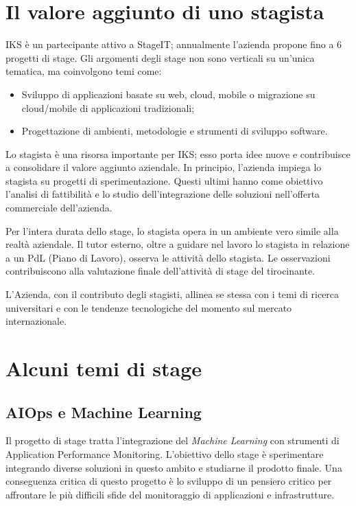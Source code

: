\section{Il valore aggiunto di uno stagista}

IKS è un partecipante attivo a StageIT; annualmente l'azienda propone fino a 6 progetti di stage. Gli argomenti degli stage non sono verticali su un'unica 
tematica, ma coinvolgono temi come: 

\begin{itemize}
	\item Sviluppo di applicazioni basate su web, \gls{cloud}, mobile 
	      o migrazione su \gls{cloud}/mobile di applicazioni tradizionali;
	\item Progettazione di ambienti, metodologie e strumenti di 
	      sviluppo software.
\end{itemize}

Lo stagista è una risorsa importante per IKS; esso porta idee nuove e contribuisce a consolidare il valore aggiunto aziendale.
In principio, l'azienda impiega lo stagista su progetti di sperimentazione. Questi ultimi hanno come obiettivo l'analisi di fattibilità e lo studio dell'integrazione delle soluzioni nell'offerta commerciale dell'azienda. 

Per l'intera durata dello stage, lo stagista opera in un ambiente vero simile alla realtà aziendale. Il tutor esterno, oltre a guidare nel lavoro lo stagista in relazione a un PdL (Piano di Lavoro), osserva le attività dello stagista. 
Le osservazioni contribuiscono alla valutazione finale dell'attività di stage del tirocinante.

L'Azienda, con il contributo degli stagisti, allinea se stessa con i temi di ricerca universitari e con le tendenze tecnologiche del momento sul mercato internazionale.

\section{Alcuni temi di stage}
\subsection{AIOps e Machine Learning}
Il progetto di stage tratta l'integrazione del \textit{Machine Learning} con strumenti di Application Performance Monitoring. L'obiettivo dello 
stage è sperimentare integrando diverse soluzioni in questo ambito e studiarne il prodotto finale. Una conseguenza critica di questo progetto è lo sviluppo di un pensiero critico per affrontare le più difficili sfide del monitoraggio di applicazioni e infrastrutture. 


